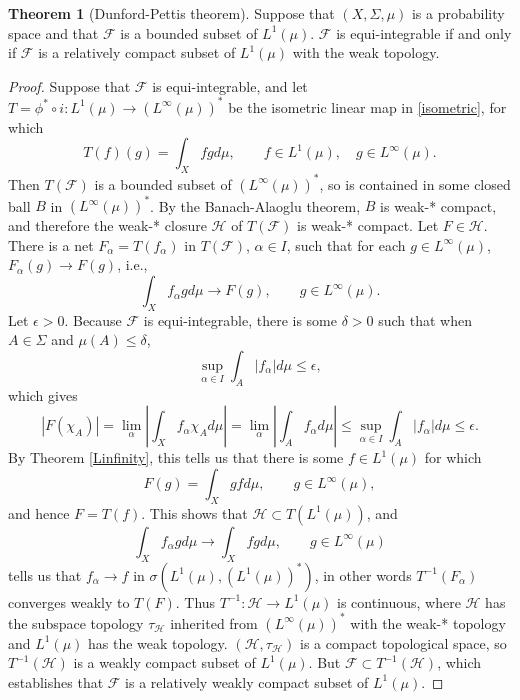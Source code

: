 \documentclass{article}
\theoremstyle{definition}
\newtheorem{theorem}{Theorem}
\theoremstyle{definition}
\begin{document}
\begin{theorem}[Dunford-Pettis theorem]
Suppose that $(X,\Sigma,\mu)$ is a probability space and that
  $\mathscr{F}$ is a bounded subset of $L^1(\mu)$. $\mathscr{F}$ is equi-integrable if and only if
$\mathscr{F}$ is a relatively compact subset of $L^1(\mu)$ with the weak topology.
\end{theorem}
\begin{proof}
Suppose that $\mathscr{F}$ is equi-integrable, and let
$T=\phi^* \circ i:L^1(\mu) \to (L^\infty(\mu))^*$ be the isometric linear map  in \eqref{isometric}, for which
\[
T(f)(g) = \int_X f g d\mu, \qquad f \in L^1(\mu), \quad g \in L^\infty(\mu).
\]
Then $T(\mathscr{F})$ is a bounded subset of $(L^\infty(\mu))^*$, so is contained in some closed
ball $B$ in $(L^\infty(\mu))^*$. By the Banach-Alaoglu theorem, $B$ is weak-* compact, and therefore the weak-* closure
$\mathscr{H}$ of $T(\mathscr{F})$ is weak-* compact. Let $F \in \mathscr{H}$. There is a net $F_\alpha=T(f_\alpha)$ in $T(\mathscr{F})$,
$\alpha \in I$, 
such that  for each $g \in L^\infty(\mu)$, $F_\alpha(g) \to F(g)$, i.e.,
\begin{equation}
\int_X f_\alpha g d\mu \to F(g), \qquad g \in L^\infty(\mu).
\label{falpha}
\end{equation}
Let  $\epsilon>0$. Because $\mathscr{F}$ is equi-integrable,
there is some $\delta>0$ such that when $A \in \Sigma$ and $\mu(A) \leq \delta$,
\[
\sup_{\alpha \in I} \int_A |f_\alpha| d\mu \leq \epsilon,
\]
which gives
\[
|F(\chi_A)| = \lim_\alpha  \left| \int_X f_\alpha \chi_A d\mu \right|
= \lim_\alpha \left| \int_A f_\alpha d\mu \right|
\leq \sup_{\alpha \in I} \int_A |f_\alpha| d\mu 
\leq \epsilon.
\]
By Theorem \ref{Linfinity}, this tells us that there is some $f \in L^1(\mu)$ for which
\[
F(g) = \int_X gf d\mu, \qquad g \in L^\infty(\mu),
\]
and hence $F=T(f)$.  This shows that $\mathscr{H} \subset T(L^1(\mu))$, and
\[
\int_X f_\alpha g d\mu \to \int_X f g d\mu, \qquad g \in L^\infty(\mu)
\]
tells us that $f_\alpha \to f$ in $\sigma(L^1(\mu),(L^1(\mu))^*)$, in other words $T^{-1}(F_\alpha)$ converges weakly to $T(F)$.
Thus $T^{-1}:\mathscr{H} \to L^1(\mu)$ is continuous, where $\mathscr{H}$ has the subspace topology $\tau_{\mathscr{H}}$ inherited from
$(L^\infty(\mu))^*$ with the weak-* topology and $L^1(\mu)$ has the weak topology. $(\mathscr{H},\tau_{\mathscr{H}})$ is a compact topological space,
so $T^{-1}(\mathscr{H})$ is a weakly compact subset of $L^1(\mu)$. But $\mathscr{F} \subset T^{-1}(\mathscr{H})$, which establishes that
$\mathscr{F}$ is a relatively weakly compact subset of $L^1(\mu)$.



\end{proof}
\end{document}
